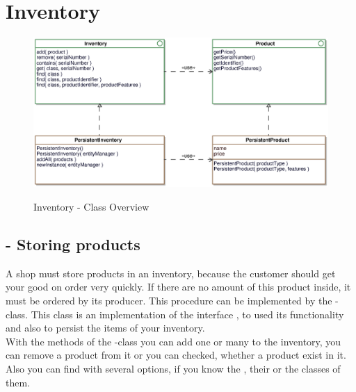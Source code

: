 \newpage
\section{Inventory}

\begin{figure}[ht]
	\centering
  \includegraphics[width=1.0\textwidth]{images/Inventory_Overview.eps}
	\label{inventory_overview}
	\caption{Inventory - Class Overview}
\end{figure}

\subsection{ - Storing products}
A shop must store products in an inventory, because the customer should get your good on order very quickly. If there are no amount of this product inside, it must be ordered by its producer.
This procedure can be implemented by the -class. This class is an implementation of the interface , to used its functionality and also 
to persist the items of your inventory.\\
With the methods of the -class you can add one or many  to the inventory, you can remove a product from it or you can checked, whether a product exist in it.
Also you can find  with several options, if you know the , their  or the classes of them.
